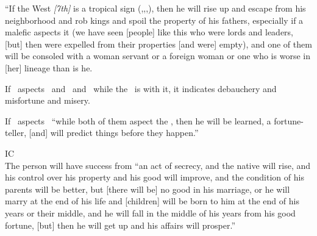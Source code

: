 ``If the West \textsl{[7th]} is a tropical sign (\Aries,\Cancer,\Libra,\Capricorn), then he will rise up and escape from his neighborhood and rob kings and spoil the property of his fathers, especially if a malefic aspects it (we have seen [people] like this who were lords and leaders, [but] then were expelled from their properties [and were] empty), and one of them will be consoled with a woman servant or a foreign woman or one who is worse in [her] lineage than is he.

If \Jupiter\, aspects \Venus\, and \Mercury\, and \Mars\, while the \Moon\, is with it, it indicates debauchery and misfortune and misery.

If \Venus\, aspects \Jupiter\, ``while both of them aspect the \Moon, then he will be learned, a fortune-teller, [and] will predict things before they happen.''

\vspace{0.5em}
\noindent\textsc{IC} \hfill \\
\indent The person will have success from ``an act of secrecy, and the native will rise, and his control over his property and his good will improve, and the condition of his parents will be better, but [there will be] no good in his marriage, or he will marry at the end of his life and [children] will be born to him at the end of his years or their middle, and he will fall in the middle of his years from his good fortune, [but] then he will get up and his affairs will prosper.''